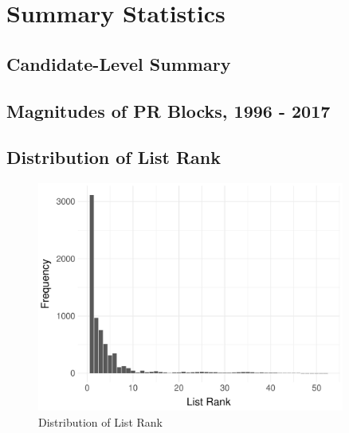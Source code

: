 \documentclass[a4paper, 11pt]{article}
\begin{document}

\newpage




\newpage

\appendix

\setcounter{table}{0}
\setcounter{figure}{0}
\renewcommand{\thetable}{A\arabic{table}}
\renewcommand{\thefigure}{A\arabic{figure}}

\section{Summary Statistics}

\subsection{Candidate-Level Summary}


\newpage

\subsection{Magnitudes of PR Blocks, 1996 - 2017}



\newpage

\subsection{Distribution of List Rank}

\begin{figure}[!htbp]
	\includegraphics[width = 0.9\textwidth]{../figure/paper/pr_rank_distribution.pdf}
	\caption{Distribution of List Rank}
	\label{fig:distRank}
\end{figure}
\end{document}
